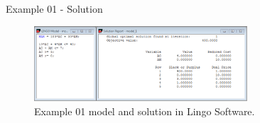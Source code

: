 \begin{frame}{Example 01 - Solution}
\begin{figure}
    \includegraphics[width=300px]{slides/ex01/screenshot.png}
    \caption{Example 01 model and solution in Lingo Software.}
\end{figure}
\end{frame}
